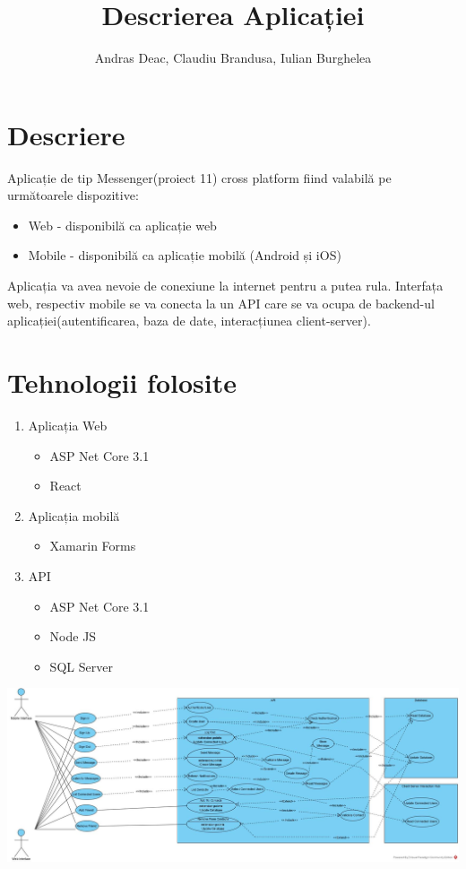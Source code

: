 \documentclass{article}
\title{Descrierea Aplicației}
\author{Andras Deac, Claudiu Brandusa, Iulian Burghelea}
\begin{document}
\maketitle{}
\newpage
\section{Descriere}
Aplicație de tip Messenger(proiect 11) cross platform fiind valabilă pe următoarele dispozitive:
\begin{itemize}
\item Web - disponibilă ca aplicație web
\item Mobile - disponibilă ca aplicație mobilă (Android și iOS)
\end{itemize}
Aplicația va avea nevoie de conexiune la internet pentru a putea rula. Interfața web, respectiv mobile se va conecta la un API care se va ocupa de backend-ul aplicației(autentificarea, baza de date, interacțiunea client-server).
\section{Tehnologii folosite}
\begin{enumerate}
\item Aplicația Web
\begin{itemize}
\item ASP Net Core 3.1
\item React
\end{itemize}
\item Aplicația mobilă
\begin{itemize}
\item Xamarin Forms
\end{itemize}
\item API
\begin{itemize}
\item ASP Net Core 3.1
\item Node JS
\item SQL Server
\end{itemize}
\end{enumerate}
\includegraphics[width=1.7\textwidth, center]{architecture.jpg}
\end{document}
